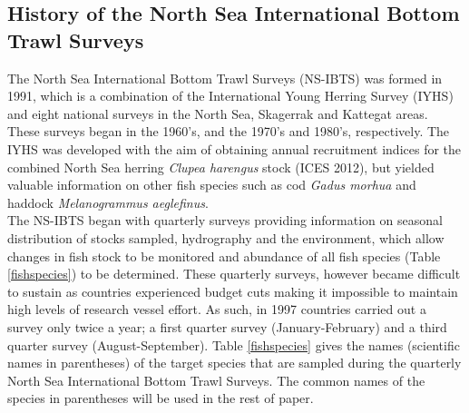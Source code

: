 \documentclass[a4paper 12pt]{article}
\numberwithin{equation}{section}
\begin{document}
\subsection{History of the North Sea International Bottom Trawl Surveys}
\indent The North Sea International Bottom Trawl Surveys (NS-IBTS) was formed in 1991, which is a combination of the International Young Herring Survey (IYHS) and eight national surveys in the North Sea, Skagerrak and Kattegat areas. These surveys began in the 1960's, and the 1970's and 1980's, respectively. The IYHS was developed with the aim of obtaining annual recruitment indices for the combined North Sea herring \emph{Clupea harengus} stock (ICES 2012), but yielded valuable information on other fish species such as cod \emph{Gadus morhua} and haddock \emph{Melanogrammus aeglefinus}.\\
\indent The NS-IBTS began with quarterly surveys providing information on seasonal distribution of stocks sampled, hydrography and the environment, which allow changes in fish stock to be monitored and abundance of all fish species  (Table \ref{fishspecies}) to be determined. These quarterly surveys, however became difficult to sustain as countries experienced budget cuts making it impossible to maintain high levels of research vessel effort. As such, in 1997 countries carried out a survey only twice a year; a first quarter survey (January-February) and a third quarter survey (August-September). Table \ref{fishspecies} gives the names  (scientific names in parentheses) of the target species that are sampled during the quarterly North Sea International Bottom Trawl Surveys. The common names of the species in parentheses will be used in the rest of paper.\\

\end{document}
